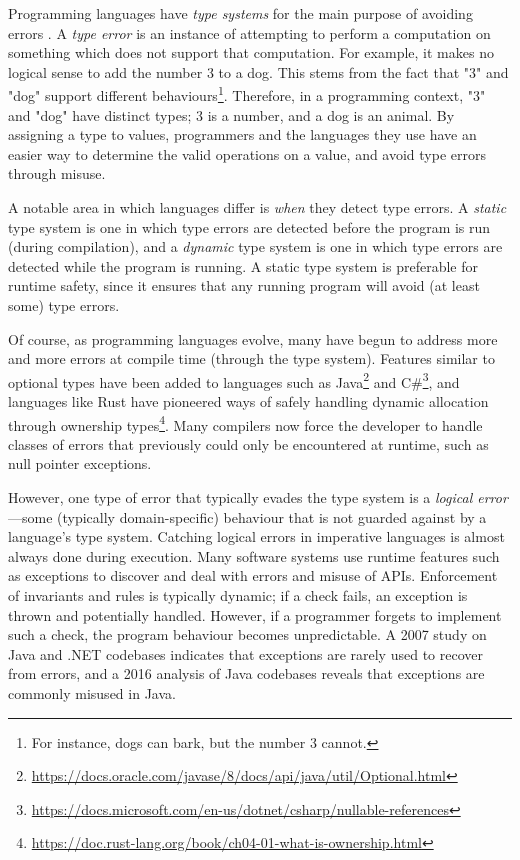 \documentclass[12pt, a4paper, bibliography=totocnumbered]{scrreprt}
\begin{document}
Programming languages have \emph{type systems} for the main purpose of avoiding errors \cite{cardellitypes}. A \emph{type error} is an instance of attempting to perform a computation on something which does not support that computation. For example, it makes no logical sense to add the number 3 to a dog. This stems from the fact that "3" and "dog" support different behaviours\footnote{For instance, dogs can bark, but the number 3 cannot.}. Therefore, in a programming context, "3" and "dog" have distinct types; 3 is a number, and a dog is an animal. By assigning a type to values, programmers and the languages they use have an easier way to determine the valid operations on a value, and avoid type errors through misuse.

A notable area in which languages differ is \emph{when} they detect type errors. A \emph{static} type system is one in which type errors are detected before the program is run (during compilation), and a \emph{dynamic} type system is one in which type errors are detected while the program is running. A static type system is preferable for runtime safety, since it ensures that any running program will avoid (at least some) type errors.

Of course, as programming languages evolve, many have begun to address more and more errors at compile time (through the type system). Features similar to optional types have been added to languages such as Java\footnote{\url{https://docs.oracle.com/javase/8/docs/api/java/util/Optional.html}} and C\#\footnote{\url{https://docs.microsoft.com/en-us/dotnet/csharp/nullable-references}}, and languages like Rust have pioneered ways of safely handling dynamic allocation through ownership types\footnote{\url{https://doc.rust-lang.org/book/ch04-01-what-is-ownership.html}}. Many compilers now force the developer to handle classes of errors that previously could only be encountered at runtime, such as null pointer exceptions.

However, one type of error that typically evades the type system is a \emph{logical error}---some (typically domain-specific) behaviour that is not guarded against by a language's type system. Catching logical errors in imperative languages is almost always done during execution. Many software systems use runtime features such as exceptions to discover and deal with errors and misuse of APIs. Enforcement of invariants and rules is typically dynamic; if a check fails, an exception is thrown and potentially handled. However, if a programmer forgets to implement such a check, the program behaviour becomes unpredictable. A 2007 study \cite{exceptionsusedpoorly} on Java and .NET codebases indicates that exceptions are rarely used to recover from errors, and a 2016 analysis of Java codebases \cite{badjavaexceptions} reveals that exceptions are commonly misused in Java.
\end{document}
